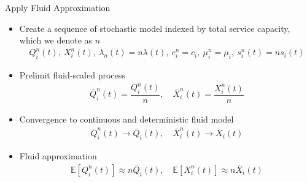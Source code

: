 \documentclass[smaller ,table,usenames,dvipsnames]{beamer}
\newcommand{\?}{\stackrel{?}{=}}
\begin{document}
\begin{frame}{Apply Fluid Approximation}
\begin{itemize}
    \item Create a sequence of stochastic model indexed by total service capacity, which we denote as $n$
    \begin{equation}
        \begin{array}{c}
          Q_i^n(t),~ X_i^n(t),~ \lambda_n(t)=n\lambda(t),~ c_i^n=c_i,~ \mu_i^n=\mu_i,~ s_i^n(t)=ns_i(t)
        \end{array}
    \end{equation}
    \item Prelimit fluid-scaled process
        \begin{equation}
            \begin{array}{c}
                 \bar{Q}^n_i(t) = \dfrac{ Q_i^n(t)}{n}, \quad \bar{X}^n_i(t) = \dfrac{ X_i^n(t)}{n}
            \end{array}
        \end{equation}
        
    \item Convergence to continuous and deterministic fluid model
        \begin{equation}
            \begin{array}{c}
                  \bar{Q}^n_i(t)\rightarrow \bar{Q}_i(t), \quad \bar{X}^n_i(t)\rightarrow \bar{X}_i(t)
            \end{array}
        \end{equation}
    \item Fluid approximation
    \begin{align}
        \mathbb{E}[Q_i^n(t)]\approx n \bar{Q}_i(t), \quad\mathbb{E}[X_i^n(t)]\approx n \bar{X}_i(t)
    \end{align}
\end{itemize}
\end{frame}
\end{document}

